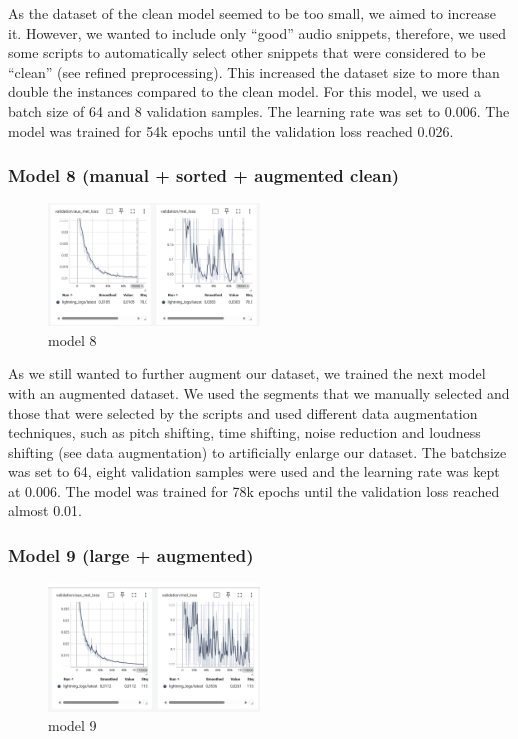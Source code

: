 \documentclass[a4paper]{article}
\begin{document}
As the dataset of the clean model seemed to be too small, we aimed to increase it. However, we wanted to include only “good” audio snippets, therefore, we used some scripts to automatically select other snippets that were considered to be “clean” (see refined preprocessing). This increased the dataset size to more than double the instances compared to the clean model. For this model, we used a batch size of 64 and 8 validation samples. The learning rate was set to 0.006. The model was trained for 54k epochs until the validation loss reached 0.026.

\subsubsection{Model 8 (manual + sorted + augmented clean)}

\begin{figure}[htbp]
    \centering
    \includegraphics[width=0.5\textwidth]{graphics/v8_testing.png}
    \caption{model 8}
    \label{fig:bild5}
\end{figure}

As we still wanted to further augment our dataset, we trained the next model with an augmented dataset. We used the segments that we manually selected and those that were selected by the scripts and used different data augmentation techniques, such as pitch shifting, time shifting, noise reduction and loudness shifting (see data augmentation) to artificially enlarge our dataset. The batchsize was set to 64, eight validation samples were used and the learning rate was kept at 0.006. The model was trained for 78k epochs until the validation loss reached almost 0.01.


\subsubsection{Model 9 (large + augmented)}

\begin{figure}[htbp]
    \centering
    \includegraphics[width=0.5\textwidth]{graphics/v9_testing.png}
    \caption{model 9}
    \label{fig:bild5}
\end{figure}
\end{document}
